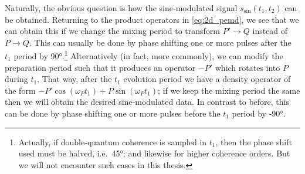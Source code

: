 Naturally, the obvious question is how the sine-modulated signal $s_\text{sin}(t_1, t_2)$ can be obtained.
Returning to the product operators in \cref{eq:2d_pemd}, we see that we can obtain this if we change the mixing period to transform $P' \to Q$ instead of $P \to Q$.
This can usually be done by phase shifting one or more pulses after the $t_1$ period by \ang{90}.\footnote{Actually, if double-quantum coherence is sampled in $t_1$, then the phase shift used must be halved, i.e.\ \ang{45}; and likewise for higher coherence orders. But we will not encounter such cases in this thesis.}
Alternatively (in fact, more commonly), we can modify the preparation period such that it produces an operator $-P'$ which rotates into $P$ during $t_1$.
That way, after the $t_1$ evolution period we have a density operator of the form $-P'\cos(\omega_P t_1) + P\sin(\omega_P t_1)$; if we keep the mixing period the same then we will obtain the desired sine-modulated data.
In contrast to before, this can be done by phase shifting one or more pulses before the $t_1$ period by \ang{-90}.

